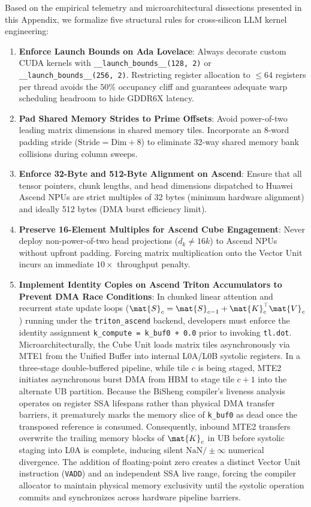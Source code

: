 Based on the empirical telemetry and microarchitectural dissections presented in this Appendix, we formalize five structural rules for cross-silicon LLM kernel engineering:
\begin{enumerate}
    \item \textbf{Enforce Launch Bounds on Ada Lovelace}: Always decorate custom CUDA kernels with \texttt{\_\_launch\_bounds\_\_(128, 2)} or \texttt{\_\_launch\_bounds\_\_(256, 2)}. Restricting register allocation to $\le 64$ registers per thread avoids the $50\%$ occupancy cliff and guarantees adequate warp scheduling headroom to hide GDDR6X latency.
    \item \textbf{Pad Shared Memory Strides to Prime Offsets}: Avoid power-of-two leading matrix dimensions in shared memory tiles. Incorporate an 8-word padding stride ($\text{Stride} = \text{Dim} + 8$) to eliminate 32-way shared memory bank collisions during column sweeps.
    \item \textbf{Enforce 32-Byte and 512-Byte Alignment on Ascend}: Ensure that all tensor pointers, chunk lengths, and head dimensions dispatched to Huawei Ascend NPUs are strict multiples of 32 bytes (minimum hardware alignment) and ideally 512 bytes (DMA burst efficiency limit).
    \item \textbf{Preserve 16-Element Multiples for Ascend Cube Engagement}: Never deploy non-power-of-two head projections ($d_k \ne 16k$) to Ascend NPUs without upfront padding. Forcing matrix multiplication onto the Vector Unit incurs an immediate $10\times$ throughput penalty.
    \item \textbf{Implement Identity Copies on Ascend Triton Accumulators to Prevent DMA Race Conditions}: In chunked linear attention and recurrent state update loops ($\mat{S}_c = \mat{S}_{c-1} + \mat{K}_c^\top \mat{V}_c$) running under the \texttt{triton\_ascend} backend, developers must enforce the identity assignment \texttt{k\_compute = k\_buf0 + 0.0} prior to invoking \texttt{tl.dot}. Microarchitecturally, the Cube Unit loads matrix tiles asynchronously via MTE1 from the Unified Buffer into internal L0A/L0B systolic registers. In a three-stage double-buffered pipeline, while tile $c$ is being staged, MTE2 initiates asynchronous burst DMA from HBM to stage tile $c+1$ into the alternate UB partition. Because the BiSheng compiler's liveness analysis operates on register SSA lifespans rather than physical DMA transfer barriers, it prematurely marks the memory slice of \texttt{k\_buf0} as dead once the transposed reference is consumed. Consequently, inbound MTE2 transfers overwrite the trailing memory blocks of $\mat{K}_c$ in UB before systolic staging into L0A is complete, inducing silent $\text{NaN}/\pm\infty$ numerical divergence. The addition of floating-point zero creates a distinct Vector Unit instruction (\texttt{VADD}) and an independent SSA live range, forcing the compiler allocator to maintain physical memory exclusivity until the systolic operation commits and synchronizes across hardware pipeline barriers.
\end{enumerate}
